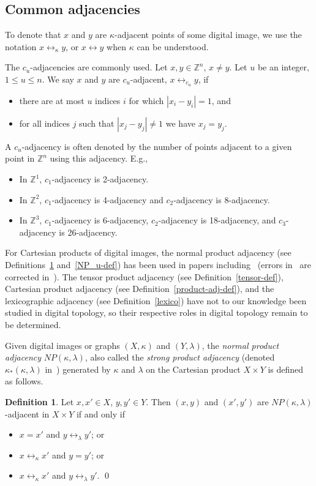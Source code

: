 \documentclass{article}
\theoremstyle{plain}
\theoremstyle{definition}
\newtheorem{definition}[thm]{Definition}
\numberwithin{thm}{section}
\newcommand{\adj}{\leftrightarrow}
\def\Z{{\mathbb Z}}
\begin{document}
\subsection{Common adjacencies}
To denote
that $x$ and $y$ are $\kappa$-adjacent points of some
digital image, we use the notation
$x \adj_{\kappa} y$, or $x \adj y$ when $\kappa$ can be understood.

The $c_u$-adjacencies are commonly used.
Let $x,y \in \Z^n$, $x \neq y$. Let $u$ be an integer,
$1 \leq u \leq n$. We say $x$ and $y$ are $c_u$-adjacent,
$x \adj_{c_u} y$, if
\begin{itemize}
\item there are at most $u$ indices $i$ for which 
      $|x_i - y_i| = 1$, and
\item for all indices $j$ such that $|x_j - y_j| \neq 1$ we
      have $x_j=y_j$.
\end{itemize}
A $c_u$-adjacency is often denoted by the number of points
adjacent to a given point in $\Z^n$ using this adjacency.
E.g.,
\begin{itemize}
\item In $\Z^1$, $c_1$-adjacency is 2-adjacency.
\item In $\Z^2$, $c_1$-adjacency is 4-adjacency and
      $c_2$-adjacency is 8-adjacency.
\item In $\Z^3$, $c_1$-adjacency is 6-adjacency,
      $c_2$-adjacency is 18-adjacency, and $c_3$-adjacency
      is 26-adjacency.
\end{itemize}

For Cartesian products of digital images, the normal product adjacency (see
Definitions~\ref{NP-def} and~\ref{NP_u-def}) has been used in papers
including~\cite{Han05,Boxer06,BoxKar12,Boxer16a} (errors in~\cite{Han05} are corrected
in~\cite{Boxer06}).
The tensor product adjacency (see Definition~\ref{tensor-def}), Cartesian product
adjacency (see Definition~\ref{product-adj-def}), and the lexicographic adjacency
(see Definition~\ref{lexico}) have not to our knowledge been studied in digital topology, so
their respective roles in digital topology remain to be determined.

Given digital images or graphs $(X,\kappa)$ and $(Y,\lambda)$, the
{\em normal product adjacency} $NP(\kappa,\lambda)$, also called
the {\em strong product adjacency}
(denoted $\kappa_*(\kappa,\lambda)$ in~\cite{BoxKar12}) generated by
$\kappa$ and $\lambda$ on the Cartesian product $X \times Y$ is defined
as follows.

\begin{definition}
\label{NP-def}
\rm{\cite{Berge,vL-W}}
Let $x, x' \in X$, $y, y' \in Y$.
Then $(x,y)$ and $(x',y')$ are $NP(\kappa,\lambda)$-adjacent in $X \times Y$
if and only if
\begin{itemize}
\item $x=x'$ and $y \adj_{\lambda} y'$; or
\item $x \adj_{\kappa} x'$ and $y=y'$; or
\item $x \adj_{\kappa} x'$ and $y \adj_{\lambda} y'$. \qed
\end{itemize}
\end{definition}
\end{document}
